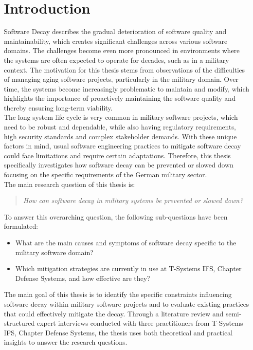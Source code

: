 \section{Introduction}
Software Decay describes the gradual deterioration of software quality and maintainability, which creates significant challenges across various software domains.
The challenges become even more pronounced in environments where the systems are often expected to operate for decades, such as in a military context.
The motivation for this thesis stems from observations of the difficulties of managing aging software projects, particularly in the military domain.
Over time, the systems become increasingly problematic to maintain and modify, which highlights the importance of proactively maintaining the software quality and thereby ensuring long-term viability.\\
The long system life cycle is very common in military software projects, which need to be robust and dependable, while also having regulatory requirements,
high security standards and complex stakeholder demands. With these unique factors in mind, usual software engineering practices to mitigate software decay 
could face limitations and require certain adaptations. Therefore, this thesis specifically investigates how software decay can be prevented or slowed down
focusing on the specific requirements of the German military sector.\\
The main research question of this thesis is:
\begin{quote}
    \textit{How can software decay in military systems be prevented or slowed down?}
\end{quote}
To answer this overarching question, the following sub-questions have been formulated:
\begin{itemize}
    \item What are the main causes and symptoms of software decay specific to the military software domain?
    \item Which mitigation strategies are currently in use at T-Systems IFS, Chapter Defense Systems, and how effective are they?
\end{itemize}
The main goal of this thesis is to identify the specific constraints influencing software decay within military software projects and to evaluate existing practices that could effectively mitigate the decay.
Through a literature review and semi-structured expert interviews conducted with three practitioners from T-Systems IFS, Chapter Defense Systems, the thesis uses both theoretical and practical insights to answer the research questions.\\
